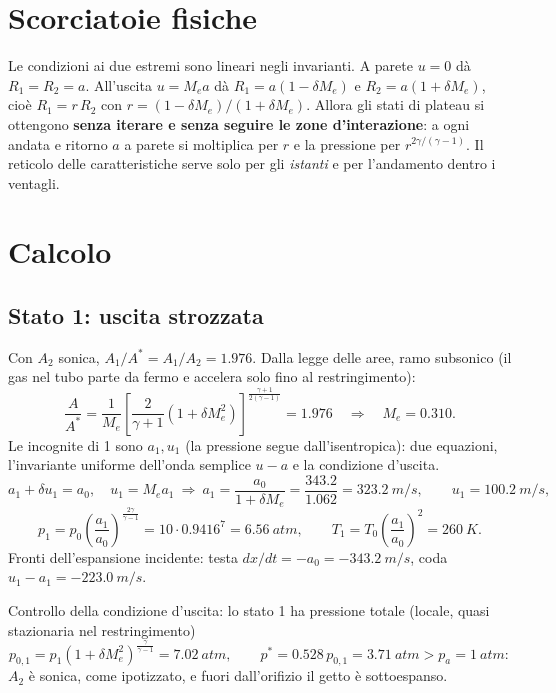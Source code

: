 \documentclass[11pt,a4paper]{article}
\newcommand{\uma}{u-a}
\begin{document}
\section{Scorciatoie fisiche}
Le condizioni ai due estremi sono lineari negli invarianti. A parete $u=0$ dà $R_1=R_2=a$. All'uscita $u=M_ea$
dà $R_1=a(1-\delta M_e)$ e $R_2=a(1+\delta M_e)$, cioè $R_1=r\,R_2$ con $r=(1-\delta M_e)/(1+\delta M_e)$. Allora
gli stati di plateau si ottengono \textbf{senza iterare e senza seguire le zone d'interazione}: a ogni andata e
ritorno $a$ a parete si moltiplica per $r$ e la pressione per $r^{2\gamma/(\gamma-1)}$. Il reticolo delle
caratteristiche serve solo per gli \emph{istanti} e per l'andamento dentro i ventagli.

\section{Calcolo}

\subsection*{Stato 1: uscita strozzata}
Con $A_2$ sonica, $A_1/A^*=A_1/A_2=\num{1.976}$. Dalla legge delle aree, ramo subsonico (il gas nel tubo parte
da fermo e accelera solo fino al restringimento):
\[
\frac{A}{A^*}=\frac1{M_e}\left[\frac{2}{\gamma+1}\left(1+\delta M_e^2\right)\right]^{\frac{\gamma+1}{2(\gamma-1)}}
=\num{1.976}\quad\Rightarrow\quad M_e=\num{0.310}.
\]
Le incognite di 1 sono $a_1,u_1$ (la pressione segue dall'isentropica): due equazioni, l'invariante uniforme
dell'onda semplice $\uma$ e la condizione d'uscita.
\[
a_1+\delta u_1=a_0,\quad u_1=M_ea_1\ \Rightarrow\
a_1=\frac{a_0}{1+\delta M_e}=\frac{\num{343.2}}{\num{1.062}}=\SI{323.2}{m/s},\qquad u_1=\SI{100.2}{m/s},
\]
\[
p_1=p_0\left(\frac{a_1}{a_0}\right)^{\frac{2\gamma}{\gamma-1}}=10\cdot\num{0.9416}^{7}=\SI{6.56}{atm},
\qquad T_1=T_0\left(\frac{a_1}{a_0}\right)^2=\SI{260}{K}.
\]
Fronti dell'espansione incidente: testa $dx/dt=-a_0=\SI{-343.2}{m/s}$, coda $u_1-a_1=\SI{-223.0}{m/s}$.

Controllo della condizione d'uscita: lo stato 1 ha pressione totale (locale, quasi stazionaria nel
restringimento)
\[
p_{0,1}=p_1\left(1+\delta M_e^2\right)^{\frac{\gamma}{\gamma-1}}=\SI{7.02}{atm},\qquad
p^*=\num{0.528}\,p_{0,1}=\SI{3.71}{atm}>p_a=\SI{1}{atm}:
\]
$A_2$ è sonica, come ipotizzato, e fuori dall'orifizio il getto è sottoespanso.
\end{document}

